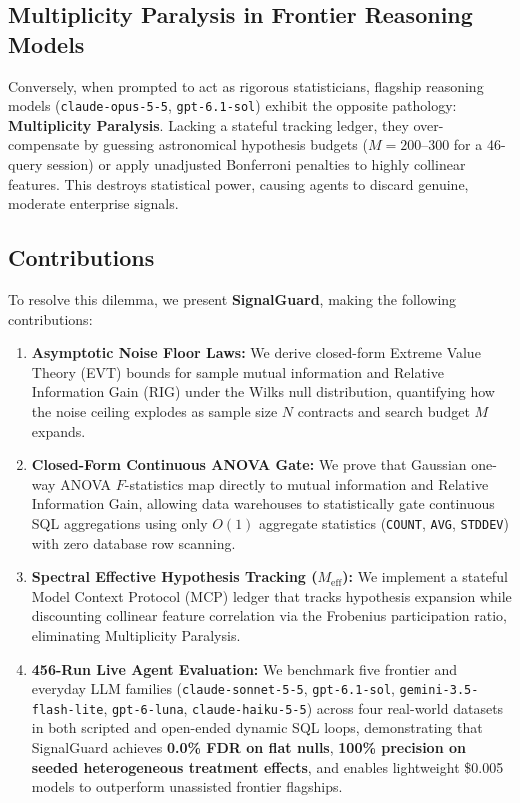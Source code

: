 \documentclass[11pt,a4paper]{article}
\begin{document}
\subsection{Multiplicity Paralysis in Frontier Reasoning Models}
Conversely, when prompted to act as rigorous statisticians, flagship reasoning models (\texttt{claude-opus-5-5}, \texttt{gpt-6.1-sol}) exhibit the opposite pathology: \textbf{Multiplicity Paralysis}. Lacking a stateful tracking ledger, they over-compensate by guessing astronomical hypothesis budgets ($M = 200\text{--}300$ for a 46-query session) or apply unadjusted Bonferroni penalties to highly collinear features. This destroys statistical power, causing agents to discard genuine, moderate enterprise signals.

\subsection{Contributions}
To resolve this dilemma, we present \textbf{SignalGuard}, making the following contributions:
\begin{enumerate}
    \item \textbf{Asymptotic Noise Floor Laws:} We derive closed-form Extreme Value Theory (EVT) bounds for sample mutual information and Relative Information Gain ($\text{RIG}$) under the Wilks null distribution, quantifying how the noise ceiling explodes as sample size $N$ contracts and search budget $M$ expands.
    \item \textbf{Closed-Form Continuous ANOVA Gate:} We prove that Gaussian one-way ANOVA $F$-statistics map directly to mutual information and Relative Information Gain, allowing data warehouses to statistically gate continuous SQL aggregations using only $O(1)$ aggregate statistics (\texttt{COUNT}, \texttt{AVG}, \texttt{STDDEV}) with zero database row scanning.
    \item \textbf{Spectral Effective Hypothesis Tracking ($M_{\text{eff}}$):} We implement a stateful Model Context Protocol (MCP) ledger that tracks hypothesis expansion while discounting collinear feature correlation via the Frobenius participation ratio, eliminating Multiplicity Paralysis.
    \item \textbf{456-Run Live Agent Evaluation:} We benchmark five frontier and everyday LLM families (\texttt{claude-sonnet-5-5}, \texttt{gpt-6.1-sol}, \texttt{gemini-3.5-flash-lite}, \texttt{gpt-6-luna}, \texttt{claude-haiku-5-5}) across four real-world datasets in both scripted and open-ended dynamic SQL loops, demonstrating that SignalGuard achieves \textbf{0.0\% FDR on flat nulls}, \textbf{100\% precision on seeded heterogeneous treatment effects}, and enables lightweight \$0.005 models to outperform unassisted frontier flagships.
\end{enumerate}
\end{document}
